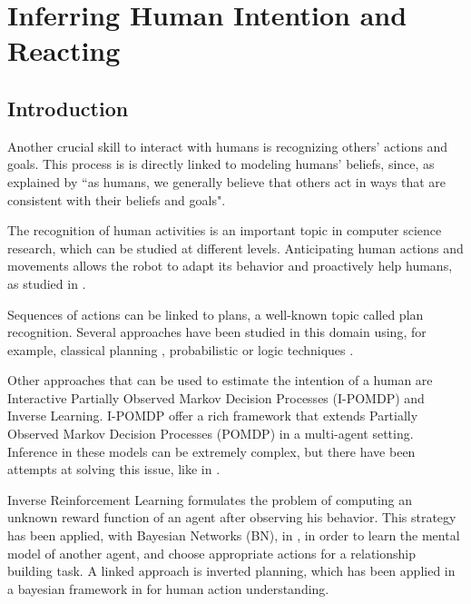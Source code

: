 \chapter{Inferring Human Intention and Reacting} %

\label{chapter:intention} %



\section{Introduction}
Another crucial skill to interact with humans is recognizing others' actions and goals. This process is is directly linked to modeling humans' beliefs, since, as explained by \cite{byom2013theory} ``as humans, we generally believe that others act in ways that are consistent with their beliefs and goals". 

The recognition of human activities is an important topic in computer science research, which can be studied at different levels. Anticipating human actions and movements allows the robot to adapt its behavior and proactively help humans, as studied in \cite{koppula2013anticipating}. 

Sequences of actions can be linked to plans, a well-known topic called plan recognition. Several approaches have been studied in this domain using, for example, classical planning \cite{ramirez2009plan}, probabilistic \cite{bui2003general} or logic techniques \cite{singla2011abductive}.

Other approaches that can be used to estimate the intention of a human are Interactive Partially Observed Markov Decision Processes (I-POMDP) and Inverse Learning. I-POMDP  \cite{gmytrasiewicz2004interactive} offer a rich framework that extends Partially Observed Markov Decision Processes (POMDP) in a multi-agent setting. Inference in these models can be extremely complex, but there have been attempts at solving this issue, like in \cite{doshi2009monte,hoang2013interactive}. 

Inverse Reinforcement Learning \cite{ng2000algorithms} formulates the problem of computing an unknown reward function of an agent after observing his behavior. This strategy has been applied, with Bayesian Networks (BN), in \cite{Nagai2015}, in order to learn the mental model of another agent, and choose appropriate actions for a relationship building task. A linked approach is inverted planning, which has been applied in a bayesian framework in \cite{baker2009action}  for human action understanding.

